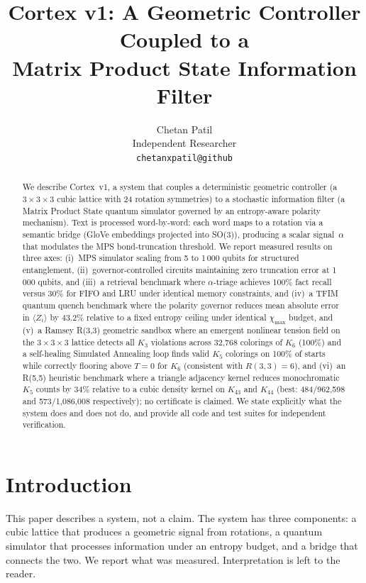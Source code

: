 \documentclass{article}
\title{Cortex v1: A Geometric Controller Coupled to a\\Matrix Product State Information Filter}
\author{%
  Chetan Patil\\
  Independent Researcher\\
  \texttt{chetanxpatil@github}
}
\begin{document}
\maketitle

\begin{abstract}
We describe Cortex~v1, a system that couples a deterministic geometric controller (a $3\!\times\!3\!\times\!3$ cubic lattice with 24 rotation symmetries) to a stochastic information filter (a Matrix Product State quantum simulator governed by an entropy-aware polarity mechanism).
Text is processed word-by-word: each word maps to a rotation via a semantic bridge (GloVe embeddings projected into SO(3)), producing a scalar signal~$\alpha$ that modulates the MPS bond-truncation threshold.
We report measured results on three axes:
(i)~MPS simulator scaling from 5 to 1\,000 qubits for structured entanglement,
(ii)~governor-controlled circuits maintaining zero truncation error at 1\,000 qubits, and
(iii)~a retrieval benchmark where $\alpha$-triage achieves 100\% fact recall versus 30\% for FIFO and LRU under identical memory constraints, and
(iv)~a TFIM quantum quench benchmark where the polarity governor reduces mean absolute error in $\langle Z_i \rangle$ by 43.2\% relative to a fixed entropy ceiling under identical $\chi_{\max}$ budget, and
(v)~a Ramsey R(3,3) geometric sandbox where an emergent nonlinear tension field on the $3\!\times\!3\!\times\!3$ lattice detects all $K_3$ violations across 32,768 colorings of $K_6$ (100\%) and a self-healing Simulated Annealing loop finds valid $K_5$ colorings on 100\% of starts while correctly flooring above $T=0$ for $K_6$ (consistent with $R(3,3)=6$), and
(vi)~an R(5,5) heuristic benchmark where a triangle adjacency kernel reduces monochromatic $K_5$ counts by 34\% relative to a cubic density kernel on $K_{43}$ and $K_{44}$ (best: 484/962,598 and 573/1,086,008 respectively); no certificate is claimed.
We state explicitly what the system does and does not do, and provide all code and test suites for independent verification.
\end{abstract}

\section{Introduction}

This paper describes a system, not a claim.  The system has three components: a cubic lattice that produces a geometric signal from rotations, a quantum simulator that processes information under an entropy budget, and a bridge that connects the two.  We report what was measured.  Interpretation is left to the reader.
\end{document}
